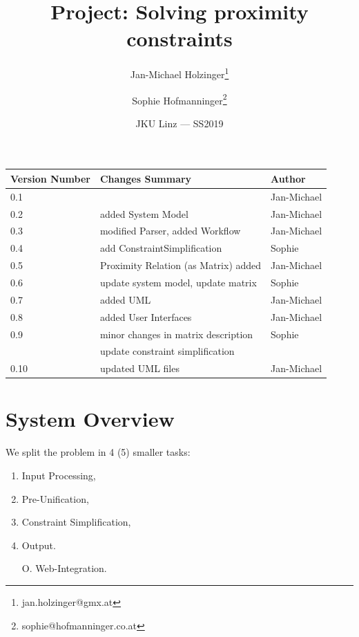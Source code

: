 \documentclass{article}
\title{Project: Solving proximity constraints} %
\author{Jan-Michael Holzinger\thanks{jan.holzinger@gmx.at} \and Sophie Hofmanninger\thanks{sophie@hofmanninger.co.at}} %
\date{JKU Linz --- SS2019} %
\begin{document}
\maketitle %


\begin{center}
\begin{tabular}[h]{|l|l|l|}
\hline
Version Number & Changes Summary & Author\\
\hline
0.1 & & Jan-Michael\\
\hline
0.2 & added System Model & Jan-Michael\\
\hline
0.3 & modified Parser, added Workflow & Jan-Michael\\
\hline
0.4 & add ConstraintSimplification & Sophie\\
\hline
0.5 & Proximity Relation (as Matrix) added & Jan-Michael\\
\hline
0.6 & update system model, update matrix & Sophie\\
\hline
0.7 & added UML & Jan-Michael\\
\hline
0.8 & added User Interfaces & Jan-Michael\\
\hline
0.9 & minor changes in matrix description & Sophie\\
& update constraint simplification&\\
\hline
0.10 & updated UML files & Jan-Michael\\
\hline
\end{tabular}

\end{center}
\section{System Overview}

We split the problem in 4 (5) smaller tasks:
\begin{enumerate}
	\item Input Processing,
	\item Pre-Unification,
	\item Constraint Simplification,
	\item Output.
	\item [O.] Web-Integration.
\end{enumerate}


\end{document}
